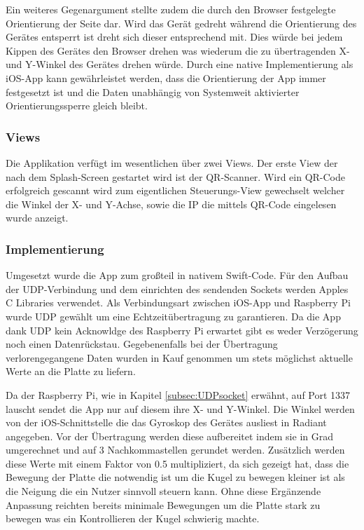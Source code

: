\documentclass[12pt,a4paper,bibliography=totoc,listof=totoc]{scrartcl}
\begin{document}
Ein weiteres Gegenargument stellte zudem die durch den Browser festgelegte Orientierung der Seite dar. 
Wird das Gerät gedreht während die Orientierung des Gerätes entsperrt ist dreht sich dieser entsprechend mit. 
Dies würde bei jedem Kippen des Gerätes den Browser drehen was wiederum die zu übertragenden X- und Y-Winkel des Gerätes drehen würde. 
Durch eine native Implementierung als iOS-App kann gewährleistet werden, dass die Orientierung der App immer festgesetzt ist und die Daten 
unabhängig von Systemweit aktivierter Orientierungssperre gleich bleibt.

\subsubsection{Views}
Die Applikation verfügt im wesentlichen über zwei Views. Der erste View der nach dem Splash-Screen gestartet wird ist der QR-Scanner. 
Wird ein QR-Code erfolgreich gescannt wird zum eigentlichen Steuerungs-View gewechselt welcher die Winkel der X- und Y-Achse, sowie 
die IP die mittels QR-Code eingelesen wurde anzeigt.

\subsubsection{Implementierung}
Umgesetzt wurde die App zum großteil in nativem Swift-Code. Für den Aufbau der UDP-Verbindung und dem einrichten des sendenden Sockets
werden Apples C Libraries verwendet. Als Verbindungsart zwischen iOS-App und Raspberry Pi wurde UDP gewählt um eine Echtzeitübertragung zu garantieren. 
Da die App dank UDP kein Acknowldge des Raspberry Pi erwartet gibt es weder Verzögerung noch einen Datenrückstau. Gegebenenfalls bei
der Übertragung verlorengegangene Daten wurden in Kauf genommen um stets möglichst aktuelle Werte an die Platte zu liefern. 

Da der Raspberry Pi, wie in Kapitel  \ref{subsec:UDPsocket} erwähnt, auf Port 1337 lauscht sendet die App nur auf diesem ihre X- und Y-Winkel. Die Winkel werden 
von der iOS-Schnittstelle die das Gyroskop des Gerätes ausliest in Radiant angegeben. Vor der Übertragung werden diese aufbereitet indem
sie in Grad umgerechnet und auf 3 Nachkommastellen gerundet werden. Zusätzlich werden diese Werte mit einem Faktor von 0.5 multipliziert, da sich
gezeigt hat, dass die Bewegung der Platte die notwendig ist um die Kugel zu bewegen kleiner ist als die Neigung die ein Nutzer sinnvoll steuern kann. 
Ohne diese Ergänzende Anpassung reichten bereits minimale Bewegungen um die Platte stark zu bewegen was ein Kontrollieren der Kugel schwierig machte.
\end{document}
